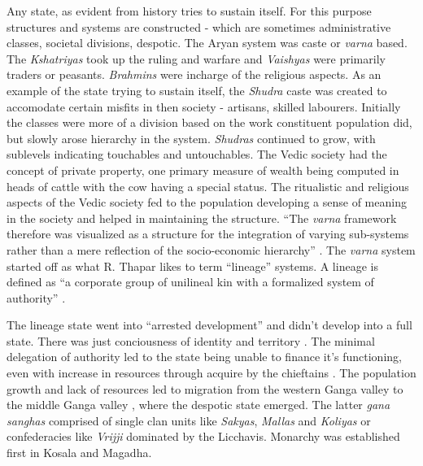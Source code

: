 \documentclass[a4paper]{article}
\begin{document}
Any state, as evident from history tries to sustain itself. For this
purpose structures and systems are constructed - which are sometimes
administrative classes, societal divisions, despotic. The Aryan system
was caste or \textit{varna} based. The \textit{Kshatriyas} took up the
ruling and warfare and \textit{Vaishyas} were primarily traders or
peasants. \textit{Brahmins} were incharge of the religious aspects. As
an example of the state trying to sustain itself, the \textit{Shudra}
caste was created to accomodate certain misfits\cite[p.
53]{thapar1984lineage} in then society - artisans, skilled labourers.
Initially the classes were more of a division based on the work
constituent population did, but slowly arose hierarchy in the system.
\textit{Shudras} continued to grow, with sublevels indicating touchables
and untouchables. The Vedic society had the concept of private property,
one primary measure of wealth being computed in heads of cattle with the
cow having a special status\cite[p. 25]{thapar1984lineage}. The
ritualistic and religious aspects of the Vedic society fed to the
population developing a sense of meaning in the society and helped in
maintaining the structure. ``The \textit{varna} framework therefore was
visualized as a structure for the integration of varying sub-systems
rather than a mere reflection of the socio-economic
hierarchy'' \cite[p. 54]{thapar1984lineage}. The \textit{varna} system
started off as what R. Thapar likes to term ``lineage'' systems. A
lineage is defined as ``a corporate group of unilineal kin with a
formalized system of authority'' \cite[p. 10]{thapar1984lineage}.

The lineage state went into ``arrested development'' \cite[p.
67]{thapar1984lineage} and didn't develop into a full state. There was
just conciousness of identity and territory \cite[p.
67]{thapar1984lineage}.  The minimal delegation of authority led to the
state being unable to finance it's functioning, even with increase in
resources through acquire by the chieftains \cite[p.
67]{thapar1984lineage} . The population growth and lack of resources led
to migration from the western Ganga valley to the middle Ganga valley
\cite[p. 77]{thapar1984lineage}, where the despotic state emerged. 
The latter \textit{gana sanghas} comprised of single clan units like
\textit{Sakyas}, \textit{Mallas} and \textit{Koliyas} or confederacies
like \textit{Vrijji} dominated by the {Licchavis}.  Monarchy was
established first in Kosala and Magadha. 
\end{document}
